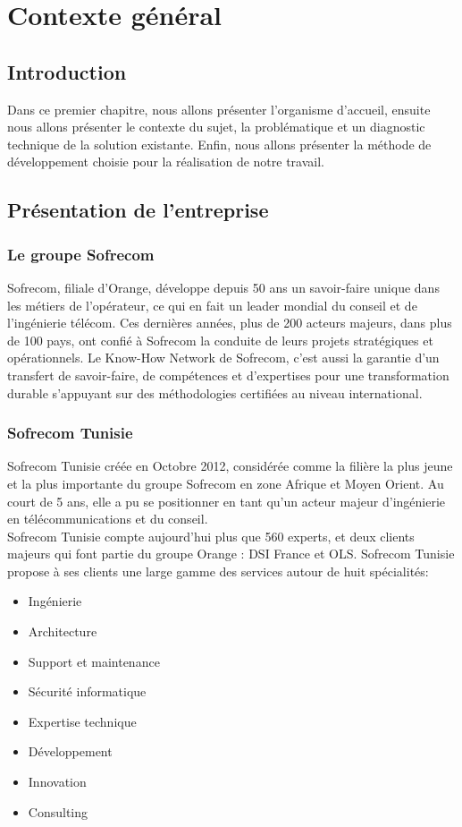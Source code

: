 \chapter{Contexte général}
\section*{Introduction}
Dans ce premier chapitre, nous allons présenter l’organisme d’accueil, ensuite nous allons présenter le contexte du sujet, la problématique et un diagnostic technique de la solution existante. Enfin, nous allons présenter la méthode de développement choisie pour la réalisation de notre travail.

\section[Présentation de l’entreprise]{Présentation de l’entreprise}

\subsection[Le groupe Sofrecom]{Le groupe Sofrecom \cite{sofrecom}}
Sofrecom, filiale d’Orange, développe depuis 50 ans un savoir-faire unique dans les métiers de l’opérateur, ce qui en fait un leader mondial du conseil et de l’ingénierie télécom. Ces dernières années, plus de 200 acteurs majeurs, dans plus de 100 pays, ont confié à Sofrecom la conduite de leurs projets stratégiques et opérationnels. Le Know-How Network de Sofrecom, c’est aussi la garantie d’un transfert de savoir-faire, de compétences et d’expertises pour une transformation durable s’appuyant sur des méthodologies certifiées au niveau international.
\subsection{Sofrecom Tunisie \cite{sofrecomTun}}
Sofrecom Tunisie créée en Octobre 2012, considérée comme la filière la plus jeune et la plus importante du groupe Sofrecom en zone Afrique et Moyen Orient. Au court de 5 ans, elle a pu se positionner en tant qu’un acteur majeur  d’ingénierie en télécommunications et du conseil.\\
Sofrecom Tunisie compte aujourd’hui plus que 560 experts, et deux clients majeurs qui font partie du groupe Orange : DSI France et OLS. Sofrecom Tunisie propose à ses clients une large  gamme des services autour de huit spécialités:
\begin{itemize}
	\item Ingénierie
	\item Architecture
	\item Support et maintenance
	\item Sécurité informatique
	\item Expertise technique
	\item Développement
	\item Innovation 
	\item Consulting
\end{itemize}


